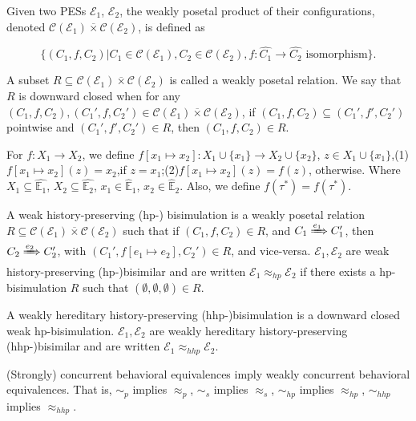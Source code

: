 \begin{definition}
Given two PESs $\mathcal{E}_1$, $\mathcal{E}_2$, the weakly posetal product of their configurations, denoted $\mathcal{C}(\mathcal{E}_1)\overline{\times}\mathcal{C}(\mathcal{E}_2)$, is defined as

$$\{(C_1,f,C_2)|C_1\in\mathcal{C}(\mathcal{E}_1),C_2\in\mathcal{C}(\mathcal{E}_2),f:\hat{C_1}\rightarrow \hat{C_2} \textrm{ isomorphism}\}.$$

A subset $R\subseteq\mathcal{C}(\mathcal{E}_1)\overline{\times}\mathcal{C}(\mathcal{E}_2)$ is called a weakly posetal relation. We say that $R$ is downward closed when for any $(C_1,f,C_2),(C_1',f,C_2')\in \mathcal{C}(\mathcal{E}_1)\overline{\times}\mathcal{C}(\mathcal{E}_2)$, if $(C_1,f,C_2)\subseteq (C_1',f',C_2')$ pointwise and $(C_1',f',C_2')\in R$, then $(C_1,f,C_2)\in R$.


For $f:X_1\rightarrow X_2$, we define $f[x_1\mapsto x_2]:X_1\cup\{x_1\}\rightarrow X_2\cup\{x_2\}$, $z\in X_1\cup\{x_1\}$,(1)$f[x_1\mapsto x_2](z)=
x_2$,if $z=x_1$;(2)$f[x_1\mapsto x_2](z)=f(z)$, otherwise. Where $X_1\subseteq \hat{\mathbb{E}_1}$, $X_2\subseteq \hat{\mathbb{E}_2}$, $x_1\in \hat{\mathbb{E}}_1$, $x_2\in \hat{\mathbb{E}}_2$. Also, we define $f(\tau^*)=f(\tau^*)$.
\end{definition}

\begin{definition}\label{WHHPB}
A weak history-preserving (hp-) bisimulation is a weakly posetal relation $R\subseteq\mathcal{C}(\mathcal{E}_1)\overline{\times}\mathcal{C}(\mathcal{E}_2)$ such that if $(C_1,f,C_2)\in R$, and $C_1\xRightarrow{e_1} C_1'$, then $C_2\xRightarrow{e_2} C_2'$, with $(C_1',f[e_1\mapsto e_2],C_2')\in R$, and vice-versa. $\mathcal{E}_1,\mathcal{E}_2$ are weak history-preserving (hp-)bisimilar and are written $\mathcal{E}_1\approx_{hp}\mathcal{E}_2$ if there exists a hp-bisimulation $R$ such that $(\emptyset,\emptyset,\emptyset)\in R$.

A weakly hereditary history-preserving (hhp-)bisimulation is a downward closed weak hp-bisimulation. $\mathcal{E}_1,\mathcal{E}_2$ are weakly hereditary history-preserving (hhp-)bisimilar and are written $\mathcal{E}_1\approx_{hhp}\mathcal{E}_2$.
\end{definition}

\begin{proposition}\label{WSCBE}
(Strongly) concurrent behavioral equivalences imply weakly concurrent behavioral equivalences. That is, $\sim_p$ implies $\approx_p$, $\sim_s$ implies $\approx_s$, $\sim_{hp}$ implies $\approx_{hp}$, $\sim_{hhp}$ implies $\approx_{hhp}$.
\end{proposition}

